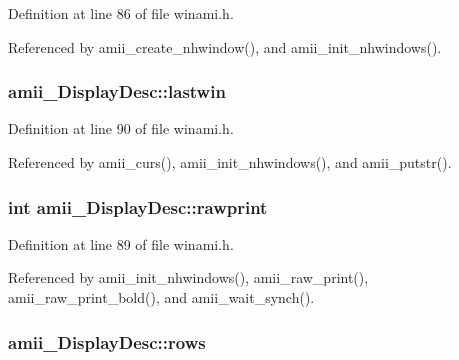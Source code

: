 Definition at line 86 of file winami.\+h.



Referenced by amii\+\_\+create\+\_\+nhwindow(), and amii\+\_\+init\+\_\+nhwindows().

\hypertarget{structamii__DisplayDesc_a7cba815a57de07b72960832e3e454fb2}{
\subsubsection[{lastwin}]{ amii\+\_\+\+Display\+Desc\+::lastwin}}\label{structamii__DisplayDesc_a7cba815a57de07b72960832e3e454fb2}


Definition at line 90 of file winami.\+h.



Referenced by amii\+\_\+curs(), amii\+\_\+init\+\_\+nhwindows(), and amii\+\_\+putstr().

\hypertarget{structamii__DisplayDesc_aaee7b747d7620b0e53252edc0bfc5782}{
\subsubsection[{rawprint}]{\setlength{\rightskip}{0pt plus 5cm}int amii\+\_\+\+Display\+Desc\+::rawprint}}\label{structamii__DisplayDesc_aaee7b747d7620b0e53252edc0bfc5782}


Definition at line 89 of file winami.\+h.



Referenced by amii\+\_\+init\+\_\+nhwindows(), amii\+\_\+raw\+\_\+print(), amii\+\_\+raw\+\_\+print\+\_\+bold(), and amii\+\_\+wait\+\_\+synch().

\hypertarget{structamii__DisplayDesc_aff6e45d6e31f2217bb6ba101207b74a2}{
\subsubsection[{rows}]{ amii\+\_\+\+Display\+Desc\+::rows}}\label{structamii__DisplayDesc_aff6e45d6e31f2217bb6ba101207b74a2}


